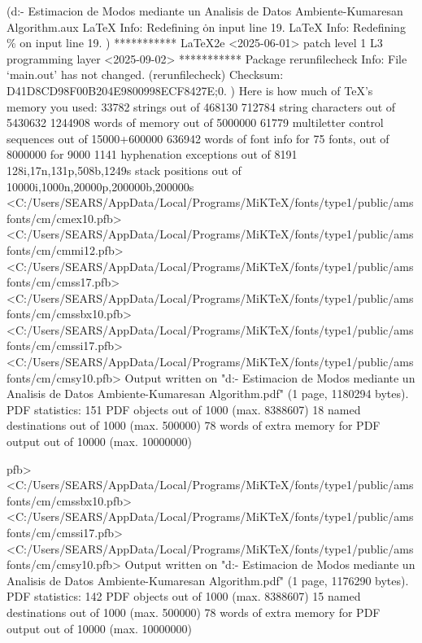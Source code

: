 (d:\Tesis - Estimacion de Modos mediante un Analisis de Datos Ambiente\Tufts-Kumaresan Algorithm\Avances\cartel\archivoslatex\main.aux
LaTeX Info: Redefining \. on input line 19.
LaTeX Info: Redefining \% on input line 19.
)
 ***********
LaTeX2e <2025-06-01> patch level 1
L3 programming layer <2025-09-02>
 ***********
Package rerunfilecheck Info: File `main.out' has not changed.
(rerunfilecheck)             Checksum: D41D8CD98F00B204E9800998ECF8427E;0.
 ) 
Here is how much of TeX's memory you used:
 33782 strings out of 468130
 712784 string characters out of 5430632
 1244908 words of memory out of 5000000
 61779 multiletter control sequences out of 15000+600000
 636942 words of font info for 75 fonts, out of 8000000 for 9000
 1141 hyphenation exceptions out of 8191
 128i,17n,131p,508b,1249s stack positions out of 10000i,1000n,20000p,200000b,200000s
<C:/Users/SEARS/AppData/Local/Programs/MiKTeX/fonts/type1/public/amsfonts/cm/cmex10.pfb><C:/Users/SEARS/AppData/Local/Programs/MiKTeX/fonts/type1/public/amsfonts/cm/cmmi12.pfb><C:/Users/SEARS/AppData/Local/Programs/MiKTeX/fonts/type1/public/amsfonts/cm/cmss17.pfb><C:/Users/SEARS/AppData/Local/Programs/MiKTeX/fonts/type1/public/amsfonts/cm/cmssbx10.pfb><C:/Users/SEARS/AppData/Local/Programs/MiKTeX/fonts/type1/public/amsfonts/cm/cmssi17.pfb><C:/Users/SEARS/AppData/Local/Programs/MiKTeX/fonts/type1/public/amsfonts/cm/cmsy10.pfb>
Output written on "d:\Tesis - Estimacion de Modos mediante un Analisis de Datos Ambiente\Tufts-Kumaresan Algorithm\Avances\cartel\archivoslatex\main.pdf" (1 page, 1180294 bytes).
PDF statistics:
 151 PDF objects out of 1000 (max. 8388607)
 18 named destinations out of 1000 (max. 500000)
 78 words of extra memory for PDF output out of 10000 (max. 10000000)

                                                                                                                                                                                                                                                                                                                                                                                                                               pfb><C:/Users/SEARS/AppData/Local/Programs/MiKTeX/fonts/type1/public/amsfonts/cm/cmssbx10.pfb><C:/Users/SEARS/AppData/Local/Programs/MiKTeX/fonts/type1/public/amsfonts/cm/cmssi17.pfb><C:/Users/SEARS/AppData/Local/Programs/MiKTeX/fonts/type1/public/amsfonts/cm/cmsy10.pfb>
Output written on "d:\Tesis - Estimacion de Modos mediante un Analisis de Datos Ambiente\Tufts-Kumaresan Algorithm\Avances\cartel\archivoslatex\main.pdf" (1 page, 1176290 bytes).
PDF statistics:
 142 PDF objects out of 1000 (max. 8388607)
 15 named destinations out of 1000 (max. 500000)
 78 words of extra memory for PDF output out of 10000 (max. 10000000)

